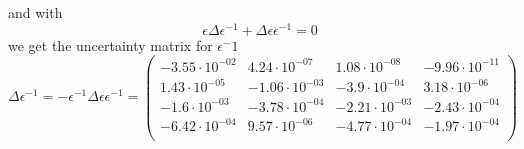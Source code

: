 \documentclass[]{article}
\begin{document}
and with
\begin{equation}
\epsilon\Delta\epsilon^{-1}+\Delta\epsilon\epsilon^{-1}=0
\end{equation}
we get the uncertainty matrix for $\epsilon^-1$
\begin{equation}
\Delta\epsilon^{-1} = -\epsilon^{-1}\Delta\epsilon\epsilon^{-1} = \begin{pmatrix}
   -3.55 \cdot 10^{-02} & 4.24 \cdot 10^{-07} & 1.08 \cdot 10^{-08} & -9.96 \cdot 10^{-11} \\
   1.43 \cdot 10^{-05} & -1.06 \cdot 10^{-03} & -3.9 \cdot 10^{-04} & 3.18 \cdot 10^{-06} \\
   -1.6 \cdot 10^{-03} & -3.78 \cdot 10^{-04} & -2.21 \cdot 10^{-03} & -2.43 \cdot 10^{-04} \\
   -6.42 \cdot 10^{-04} & 9.57 \cdot 10^{-06} & -4.77 \cdot 10^{-04} & -1.97 \cdot 10^{-04} \\
\end{pmatrix}
\label{eq:eff-inv}
\end{equation}
\end{document}
